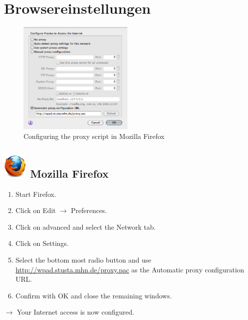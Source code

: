 \documentclass[a4paper,12pt]{scrartcl}
\begin{document}
\newpage

\section*{Browsereinstellungen}

\begin{figure}
  \begin{center}
    \includegraphics[width=0.5\textwidth,keepaspectratio]{Bilder/Proxy_Firefox_EN}
  \end{center}
  \caption{Configuring the proxy script in Mozilla Firefox}
\end{figure}

\subsection*{\includegraphics[height=1.2cm,keepaspectratio]{Bilder/Firefox_35_logo} Mozilla Firefox}
\begin{enumerate}
    \item Start Firefox.
    \item Click on Edit $\rightarrow$ Preferences.
    \item Click on advanced and select the Network tab.
    \item Click on Settings.
    \item Select the bottom most radio button and use \\ \url{http://wpad.stusta.mhn.de/proxy.pac} as the Automatic proxy configuration URL.
    \item Confirm with OK and close the remaining windows.
\end{enumerate}
$\rightarrow$ Your Internet access is now configured.
\end{document}
